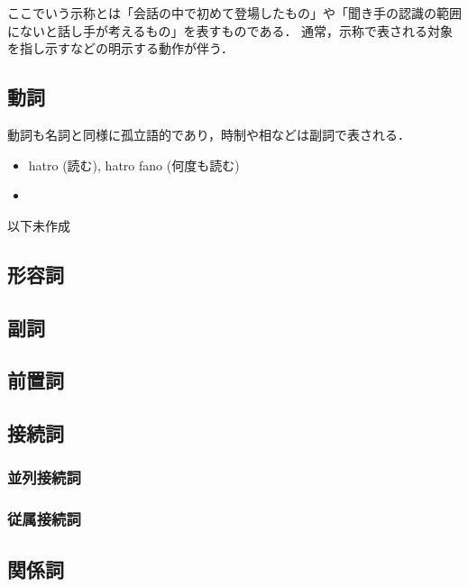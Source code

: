 \documentclass[a4paper,xelatex,ja=standard]{bxjsarticle}
\begin{document}
ここでいう示称とは「会話の中で初めて登場したもの」や「聞き手の認識の範囲にないと話し手が考えるもの」を表すものである．
通常，示称で表される対象を指し示すなどの明示する動作が伴う．

\subsection{動詞}
動詞も名詞と同様に孤立語的であり，時制や相などは副詞で表される．
\begin{itemize}
 \item hatro (読む), hatro fano (何度も読む)
 \item 
\end{itemize}
以下未作成

\subsection{形容詞}
\subsection{副詞}
\subsection{前置詞}
\subsection{接続詞}
\subsubsection{並列接続詞}
\subsubsection{従属接続詞}
\subsection{関係詞}
\end{document}
